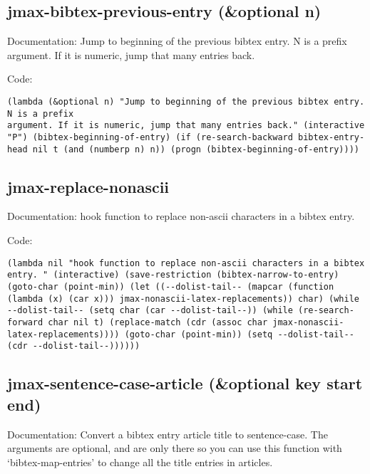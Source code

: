 \documentclass[11pt]{article}
\begin{document}
\subsection{jmax-bibtex-previous-entry (\&optional n)}
\label{sec-2-5}
Documentation: Jump to beginning of the previous bibtex entry. N is a prefix
argument. If it is numeric, jump that many entries back.

Code:
\begin{verbatim}
(lambda (&optional n) "Jump to beginning of the previous bibtex entry. N is a prefix
argument. If it is numeric, jump that many entries back." (interactive "P") (bibtex-beginning-of-entry) (if (re-search-backward bibtex-entry-head nil t (and (numberp n) n)) (progn (bibtex-beginning-of-entry))))
\end{verbatim}
\subsection{jmax-replace-nonascii}
\label{sec-2-6}
Documentation: hook function to replace non-ascii characters in a bibtex
entry. 

Code:
\begin{verbatim}
(lambda nil "hook function to replace non-ascii characters in a bibtex
entry. " (interactive) (save-restriction (bibtex-narrow-to-entry) (goto-char (point-min)) (let ((--dolist-tail-- (mapcar (function (lambda (x) (car x))) jmax-nonascii-latex-replacements)) char) (while --dolist-tail-- (setq char (car --dolist-tail--)) (while (re-search-forward char nil t) (replace-match (cdr (assoc char jmax-nonascii-latex-replacements)))) (goto-char (point-min)) (setq --dolist-tail-- (cdr --dolist-tail--))))))
\end{verbatim}
\subsection{jmax-sentence-case-article (\&optional key start end)}
\label{sec-2-7}
Documentation: Convert a bibtex entry article title to sentence-case. The
arguments are optional, and are only there so you can use this
function with `bibtex-map-entries' to change all the title
entries in articles.
\end{document}
